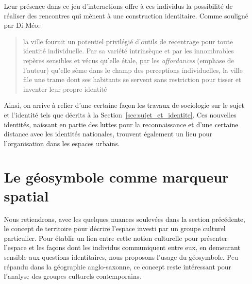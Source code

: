 Leur présence dans ce jeu d'interactions offre à ces individus la possibilité de réaliser des rencontres qui mènent à une construction identitaire.
Comme souligné par Di Méo: \blockquote[{\cite[81]{DiMeo2007}}][.]{\textelp{} la ville fournit un potentiel privilégié d’outils de recentrage pour toute identité individuelle. Par sa variété intrinsèque et par les innombrables repères sensibles et vécus qu’elle étale, par les \emph{affordances} (emphase de l'auteur) qu’elle sème dans le champ des perceptions individuelles, la ville file une trame dont ses habitants se servent sans restriction pour tisser et inventer leur propre identité}.

Ainsi, on arrive à relier d'une certaine façon les travaux de sociologie sur le sujet et l'identité tels que décrits à la Section~\ref{sec:sujet_et_identite}.
Ces nouvelles identités, naissant en partie des luttes pour la reconnaissance et d'une certaine distance avec les identités nationales, trouvent également un lieu pour l'organisation dans les espaces urbains.



\section{Le géosymbole comme marqueur spatial}
\label{sec:le_symbole_comme_marqueur_spatial}

Nous retiendrons, avec les quelques nuances soulevées dans la section précédente, le concept de territoire pour décrire l'espace investi par un groupe culturel particulier.
Pour établir un lien entre cette notion culturelle pour présenter l'espace et les façons dont les individus communiquent entre eux, en demeurant sensible aux questions identitaires, nous proposons l'usage du géosymbole.
Peu répandu dans la géographie anglo-saxonne, ce concept reste intéressant pour l'analyse des groupes culturels contemporains.


